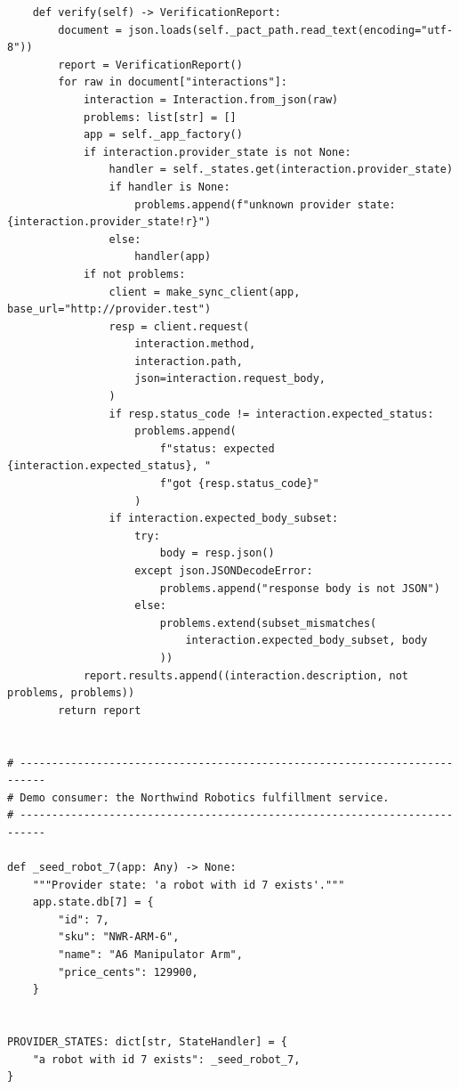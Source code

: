 \begin{verbatim}
    def verify(self) -> VerificationReport:
        document = json.loads(self._pact_path.read_text(encoding="utf-8"))
        report = VerificationReport()
        for raw in document["interactions"]:
            interaction = Interaction.from_json(raw)
            problems: list[str] = []
            app = self._app_factory()
            if interaction.provider_state is not None:
                handler = self._states.get(interaction.provider_state)
                if handler is None:
                    problems.append(f"unknown provider state: {interaction.provider_state!r}")
                else:
                    handler(app)
            if not problems:
                client = make_sync_client(app, base_url="http://provider.test")
                resp = client.request(
                    interaction.method,
                    interaction.path,
                    json=interaction.request_body,
                )
                if resp.status_code != interaction.expected_status:
                    problems.append(
                        f"status: expected {interaction.expected_status}, "
                        f"got {resp.status_code}"
                    )
                if interaction.expected_body_subset:
                    try:
                        body = resp.json()
                    except json.JSONDecodeError:
                        problems.append("response body is not JSON")
                    else:
                        problems.extend(subset_mismatches(
                            interaction.expected_body_subset, body
                        ))
            report.results.append((interaction.description, not problems, problems))
        return report


# --------------------------------------------------------------------------
# Demo consumer: the Northwind Robotics fulfillment service.
# --------------------------------------------------------------------------

def _seed_robot_7(app: Any) -> None:
    """Provider state: 'a robot with id 7 exists'."""
    app.state.db[7] = {
        "id": 7,
        "sku": "NWR-ARM-6",
        "name": "A6 Manipulator Arm",
        "price_cents": 129900,
    }


PROVIDER_STATES: dict[str, StateHandler] = {
    "a robot with id 7 exists": _seed_robot_7,
}



\end{verbatim}
